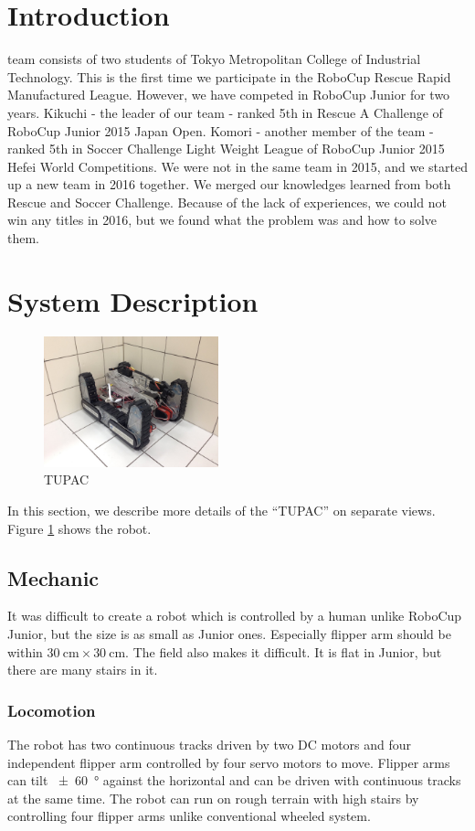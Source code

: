 \documentclass[journal]{IEEEtran}
\DeclareRobustCommand{\TMCIT}{Tokyo Metropolitan College of Industrial Technology}
\begin{document}
\IEEEpeerreviewmaketitle

\section{Introduction}
 team consists of two students of \TMCIT.
This is the first time we participate in the RoboCup Rescue Rapid Manufactured League.
However, we have competed in RoboCup Junior for two years.
Kikuchi - the leader of our team - ranked 5th in Rescue A Challenge of RoboCup Junior 2015 Japan Open.
Komori - another member of the team - ranked 5th in Soccer Challenge Light Weight League of RoboCup Junior 2015 Hefei World Competitions.
We were not in the same team in 2015, and we started up a new team in 2016 together.
We merged our knowledges learned from both Rescue and Soccer Challenge.
Because of the lack of experiences, we could not win any titles in 2016, but we found what the problem was and how to solve them.

\section{System Description}
\begin{figure}[!t]
    \centering
    \includegraphics[width=0.45\textwidth]{robot.jpg}
    \caption{TUPAC} \label{fig:robot}
\end{figure}
In this section, we describe more details of the ``TUPAC'' on separate views.
Figure \ref{fig:robot} shows the robot.

\subsection{Mechanic}
It was difficult to create a robot which is controlled by a human unlike RoboCup Junior, but the size is as small as Junior ones.
Especially flipper arm should be within \(\SI{30}{\cm} \times \SI{30}{\cm}\).
The field also makes it difficult.
It is flat in Junior, but there are many stairs in it.

\subsubsection{Locomotion}
The robot has two continuous tracks driven by two DC motors and four independent flipper arm controlled by four servo motors to move.
Flipper arms can tilt \SI{\pm60}{\degree} against the horizontal and can be driven with continuous tracks at the same time.
The robot can run on rough terrain with high stairs by controlling four flipper arms unlike conventional wheeled system.
\end{document}
